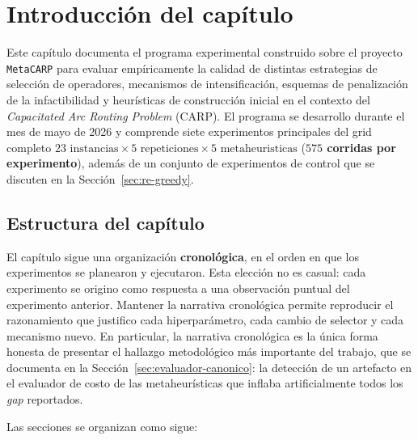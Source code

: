 \section{Introducción del capítulo}

Este capítulo documenta el programa experimental construido sobre el
proyecto \texttt{MetaCARP} para evaluar empíricamente la calidad de
distintas estrategias de selección de operadores, mecanismos de
intensificación, esquemas de penalización de la infactibilidad y
heurísticas de construcción inicial en el contexto del
\emph{Capacitated Arc Routing Problem} (CARP). El programa se
desarrollo durante el mes de mayo de 2026 y comprende siete
experimentos principales del grid completo $23\text{ instancias} \times
5\text{ repeticiones} \times 5\text{ metaheuristicas}$ (\textbf{$575$
corridas por experimento}), además de un conjunto de experimentos de
control que se discuten en la Sección~\ref{sec:re-greedy}.

\subsection{Estructura del capítulo}

El capítulo sigue una organización \textbf{cronológica}, en el orden en
que los experimentos se planearon y ejecutaron. Esta elección no es
casual: cada experimento se origino como respuesta a una observación
puntual del experimento anterior. Mantener la narrativa cronológica
permite reproducir el razonamiento que justifico cada hiperparámetro,
cada cambio de selector y cada mecanismo nuevo. En particular, la
narrativa cronológica es la única forma honesta de presentar el
hallazgo metodológico más importante del trabajo, que se documenta en
la Sección~\ref{sec:evaluador-canonico}: la detección de un artefacto
en el evaluador de costo de las metaheurísticas que inflaba
artificialmente todos los \emph{gap} reportados.

Las secciones se organizan como sigue:

